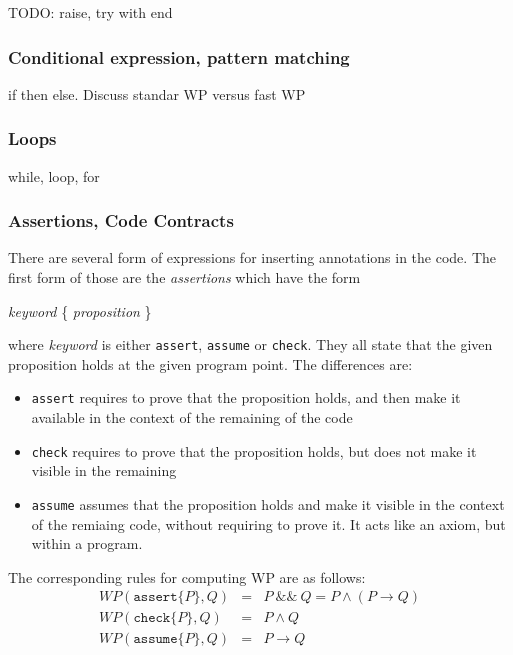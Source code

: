 TODO: raise, try with end

\subsubsection{Conditional expression, pattern matching}

if then else. Discuss standar WP versus fast WP

\subsubsection{Loops}

while, loop, for

\subsubsection{Assertions, Code Contracts}

There are several form of expressions for inserting annotations in the code.
The first form of those are the \emph{assertions} which have the form
\begin{flushleft}\ttfamily
  \textsl{keyword} \{ \textsl{proposition} \}
\end{flushleft}
where \textsl{keyword} is either \texttt{assert}, \texttt{assume} or
\texttt{check}. They all state that the given proposition holds at the given program point. The differences are:
\begin{itemize}
\item \texttt{assert} requires to prove that the proposition holds, and then make it available in the context of the remaining of the code
\item \texttt{check} requires to prove that the proposition holds, but
  does not make it visible in the remaining
\item \texttt{assume} assumes that the proposition holds and make it
  visible in the context of the remiaing code, without requiring to
  prove it. It acts like an axiom, but within a program.
\end{itemize}
The corresponding rules for computing WP are as follows:
\begin{eqnarray*}
  WP(\texttt{assert} \{ P \}, Q) &=& P \mathop{\&\&} Q = P \land (P \rightarrow Q)\\
  WP(\texttt{check} \{ P \}, Q) &=& P \land Q \\
  WP(\texttt{assume} \{ P \}, Q) &=& P \rightarrow Q
\end{eqnarray*}

